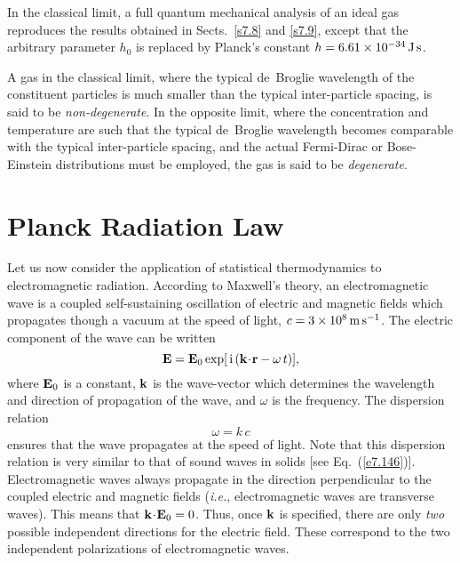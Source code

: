 In the classical limit,
a full quantum mechanical analysis of an ideal gas reproduces the results
obtained in Sects.~\ref{s7.8} and \ref{s7.9}, except that the
arbitrary parameter $h_0$ is replaced by Planck's constant
$h=6.61\times 10^{-34}\,{\rm J\,s}$.  

A gas in the classical limit, where the typical de~Broglie wavelength of the
constituent particles is  much smaller than the typical inter-particle
spacing, is said to be {\em non-degenerate}. In the opposite limit,
where the concentration and temperature are such that the typical
de~Broglie wavelength 
becomes comparable with the typical inter-particle spacing, and the actual
Fermi-Dirac or Bose-Einstein distributions must be employed, the
gas is said to be {\em degenerate}.

\section{Planck Radiation Law}
Let us now consider the application of statistical thermodynamics to electromagnetic
radiation. According to Maxwell's theory, an electromagnetic wave is a coupled
self-sustaining 
oscillation of electric and magnetic fields which propagates though a vacuum at
the speed of light, $c=3\times 10^8\,{\rm m}\,{\rm s}^{-1}$. The electric
 component of the wave  can be written
\begin{equation}
{\bf E} = {\bf E}_0 \exp[\,{\rm i}\,({\bf k}\!\cdot \!{\bf r} - \omega\, t)],
\end{equation}
where ${\bf E}_0$ is a constant, ${\bf k}$ is the wave-vector which determines
the wavelength and direction of propagation of the wave, and $\omega$ is
the frequency. The dispersion relation
\begin{equation}
\omega = k\, c\label{e8.69}
\end{equation}
ensures that the wave propagates at the speed of light. Note that this dispersion
relation is very similar to that of sound waves in solids [see Eq.~(\ref{e7.146})].
Electromagnetic waves always propagate in the direction perpendicular to the
coupled electric and magnetic fields ({\em i.e.}, 
electromagnetic waves are transverse waves).
This means that ${\bf k}\!\cdot\! {\bf E}_0 = 0$. Thus, once ${\bf k}$ is specified,
there are only {\em two}\/ possible
independent
 directions for the electric field. 
These correspond to the two independent polarizations of electromagnetic waves.

